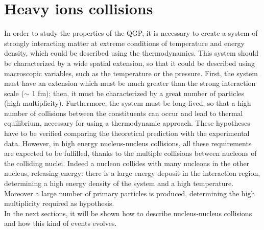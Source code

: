 \section{Heavy ions collisions}
In order to study the properties of the QGP, it is necessary to create a system of strongly interacting matter at extreme conditions of temperature and energy density, which could be described using the thermodynamics. This system should be characterized by a wide spatial extension, so that it could be described using macroscopic variables, such as the temperature or the pressure. First, the system must have an extension which must be much greater than the strong interaction scale ($\sim$ 1 fm); then, it must be characterized by a great number of particles (high multiplicity). Furthermore, the system must be long lived, so that a high number of collisions between the constituents can occur and lead to thermal equilibrium, necessary for using a thermodynamic approach. These hypotheses have to be verified comparing the theoretical prediction with the experimental data. However, in high energy nucleus-nucleus collisions, all these requirements are expected to be fulfilled, thanks to the multiple collisions between nucleons of the colliding nuclei. Indeed a nucleon collides with many nucleons in the other nucleus, releasing energy: there is a large energy deposit in the interaction region, determining a high energy density of the system and a high temperature. Moreover a large number of primary particles is produced, determining the high multiplicity required as hypothesis.\\
In the next sections, it will be shown how to describe nucleus-nucleus collisions and how this kind of events evolves.\\
%

